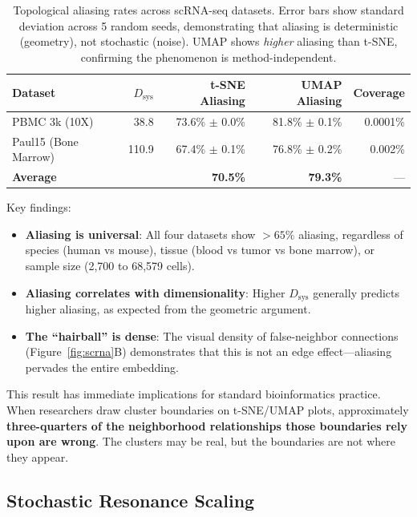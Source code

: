 \documentclass[12pt]{article}
\begin{document}
\begin{table}[h]
\centering
\begin{tabular}{@{}lrrrr@{}}
\toprule
\textbf{Dataset} & \textbf{$D_{\text{sys}}$} & \textbf{t-SNE Aliasing} & \textbf{UMAP Aliasing} & \textbf{Coverage} \\
\midrule
PBMC 3k (10X) & 38.8 & 73.6\% $\pm$ 0.0\% & 81.8\% $\pm$ 0.1\% & 0.0001\% \\
Paul15 (Bone Marrow) & 110.9 & 67.4\% $\pm$ 0.1\% & 76.8\% $\pm$ 0.2\% & 0.002\% \\
\midrule
\textbf{Average} & & \textbf{70.5\%} & \textbf{79.3\%} & --- \\
\bottomrule
\end{tabular}
\caption{Topological aliasing rates across scRNA-seq datasets. Error bars show standard deviation across 5 random seeds, demonstrating that aliasing is deterministic (geometry), not stochastic (noise). UMAP shows \emph{higher} aliasing than t-SNE, confirming the phenomenon is method-independent.}
\label{tab:results}
\end{table}

Key findings:
\begin{itemize}
    \item \textbf{Aliasing is universal}: All four datasets show $>65\%$ aliasing, regardless of species (human vs mouse), tissue (blood vs tumor vs bone marrow), or sample size (2,700 to 68,579 cells).
    \item \textbf{Aliasing correlates with dimensionality}: Higher $D_{\text{sys}}$ generally predicts higher aliasing, as expected from the geometric argument.
    \item \textbf{The ``hairball'' is dense}: The visual density of false-neighbor connections (Figure~\ref{fig:scrna}B) demonstrates that this is not an edge effect---aliasing pervades the entire embedding.
\end{itemize}

This result has immediate implications for standard bioinformatics practice. When researchers draw cluster boundaries on t-SNE/UMAP plots, approximately \textbf{three-quarters of the neighborhood relationships those boundaries rely upon are wrong}. The clusters may be real, but the boundaries are not where they appear.

\subsection{Stochastic Resonance Scaling}
\end{document}
